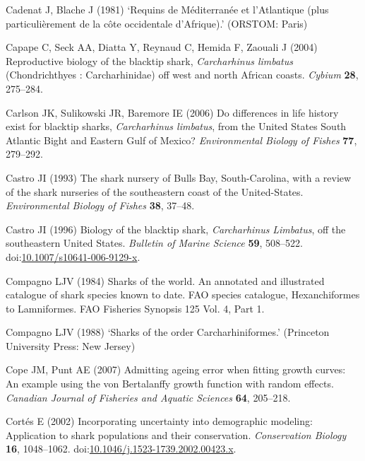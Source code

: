 \documentclass[]{article}
\begin{document}
\hypertarget{ref-cadenat_requins_1981}{}
Cadenat J, Blache J (1981) `Requins de Méditerranée et l'Atlantique
(plus particulièrement de la côte occidentale d'Afrique).' (ORSTOM:
Paris)

\hypertarget{ref-capape_reproductive_2004}{}
Capape C, Seck AA, Diatta Y, Reynaud C, Hemida F, Zaouali J (2004)
Reproductive biology of the blacktip shark, \emph{Carcharhinus limbatus}
(Chondrichthyes : Carcharhinidae) off west and north African coasts.
\emph{Cybium} \textbf{28}, 275--284.

\hypertarget{ref-carlson_differences_2006}{}
Carlson JK, Sulikowski JR, Baremore IE (2006) Do differences in life
history exist for blacktip sharks, \emph{Carcharhinus limbatus}, from
the United States South Atlantic Bight and Eastern Gulf of Mexico?
\emph{Environmental Biology of Fishes} \textbf{77}, 279--292.

\hypertarget{ref-castro_shark_1993}{}
Castro JI (1993) The shark nursery of Bulls Bay, South-Carolina, with a
review of the shark nurseries of the southeastern coast of the
United-States. \emph{Environmental Biology of Fishes} \textbf{38},
37--48.

\hypertarget{ref-castro_biology_1996}{}
Castro JI (1996) Biology of the blacktip shark, \emph{Carcharhinus}
\emph{Limbatus}, off the southeastern United States. \emph{Bulletin of
Marine Science} \textbf{59}, 508--522.
doi:\href{https://doi.org/10.1007/s10641-006-9129-x}{10.1007/s10641-006-9129-x}.

\hypertarget{ref-compagno_sharks_1984}{}
Compagno LJV (1984) Sharks of the world. An annotated and illustrated
catalogue of shark species known to date. FAO species catalogue,
Hexanchiformes to Lamniformes. FAO Fisheries Synopsis 125 Vol. 4, Part
1.

\hypertarget{ref-compagno_sharks_1988}{}
Compagno LJV (1988) `Sharks of the order Carcharhiniformes.' (Princeton
University Press: New Jersey)

\hypertarget{ref-cope_admitting_2007}{}
Cope JM, Punt AE (2007) Admitting ageing error when fitting growth
curves: An example using the von Bertalanffy growth function with random
effects. \emph{Canadian Journal of Fisheries and Aquatic Sciences}
\textbf{64}, 205--218.

\hypertarget{ref-cortes_incorporating_2002}{}
Cortés E (2002) Incorporating uncertainty into demographic modeling:
Application to shark populations and their conservation.
\emph{Conservation Biology} \textbf{16}, 1048--1062.
doi:\href{https://doi.org/10.1046/j.1523-1739.2002.00423.x}{10.1046/j.1523-1739.2002.00423.x}.
\end{document}
